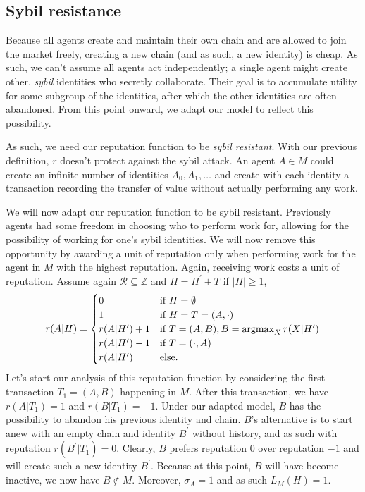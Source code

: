 \subsection{Sybil resistance}
Because all agents create and maintain their own chain and are allowed to join the market freely, creating a new chain (and as such, a new identity) is cheap. As such, we can't assume all agents act independently; a single agent might create other, \emph{sybil} identities who secretly collaborate. Their goal is to accumulate utility for some subgroup of the identities, after which the other identities are often abandoned. From this point onward, we adapt our model to reflect this possibility.

As such, we need our reputation function to be \emph{sybil resistant}. With our previous definition, $r$ doesn't protect against the sybil attack. An agent $A \in M$ could create an infinite number of identities $A_0, A_1, \ldots$ and create with each identity a transaction recording the transfer of value without actually performing any work.

We will now adapt our reputation function to be sybil resistant. Previously agents had some freedom in choosing who to perform work for, allowing for the possibility of working for one's sybil identities. We will now remove this opportunity by awarding a unit of reputation only when performing work for the agent in $M$ with the highest reputation. Again, receiving work costs a unit of reputation. Assume again $\mathcal{R} \subseteq \mathds{Z}$ and $H = H^\prime + T$ if $|H| \geq 1$,
\[ r(A|H) = \begin{cases}
0 & \text{if } H = \emptyset\\
1 & \text{if } H = T = (A, \cdot)\\
r(A|H^\prime) + 1 & \text{if } T = (A, B), B = \operatorname*{argmax}_X r(X|H^\prime)\\
r(A|H^\prime) - 1 & \text{if } T = (\cdot, A)\\
r(A|H^\prime) & \text{else}.\\ 
\end{cases} \]
Let's start our analysis of this reputation function by considering the first transaction $T_1 = (A, B)$ happening in $M$. After this transaction, we have $r(A|T_1) = 1$ and $r(B|T_1) = -1$. Under our adapted model, $B$ has the possibility to abandon his previous identity and chain. $B$'s alternative is to start anew with an empty chain and identity $B^\prime$ without history, and as such with reputation $r(B^\prime|T_1) = 0$. Clearly, $B$ prefers reputation $0$ over reputation $-1$ and will create such a new identity $B^\prime$. Because at this point, $B$ will have become inactive, we now have $B \not \in M$. Moreover, $\sigma_A = 1$ and as such $L_M(H) = 1$.

